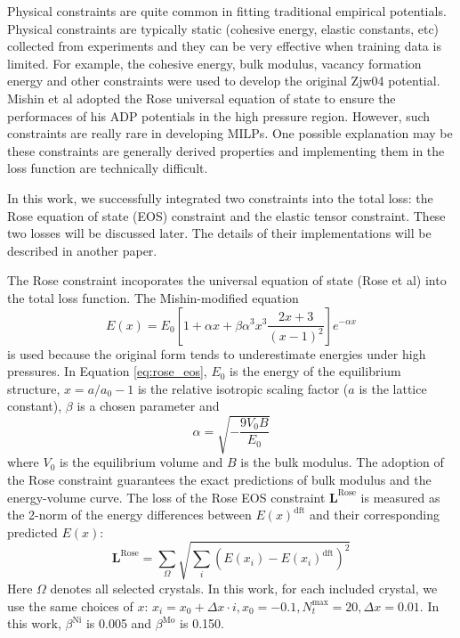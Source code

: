 \documentclass[prb,reprint]{revtex4-2}
\begin{document}
Physical constraints are quite common in fitting traditional empirical 
potentials. Physical constraints are typically static (cohesive energy, elastic 
constants, etc) collected from experiments and they can be very effective when 
training data is limited. For example, the cohesive energy, bulk modulus, 
vacancy formation energy and other constraints were used to develop the original 
Zjw04 potential. Mishin et al adopted the Rose universal equation of state to 
ensure the performaces of his ADP potentials in the high pressure region. 
However, such constraints are really rare in developing MILPs. One possible 
explanation may be these constraints are generally derived properties and 
implementing them in the loss function are technically difficult.

In this work, we successfully integrated two constraints into the total loss:
the Rose equation of state (EOS) constraint and the elastic tensor constraint. 
These two losses will be discussed later. The details of their implementations 
will be described in another paper.

The Rose constraint incoporates the universal equation of state (Rose et al) 
into the total loss function. The Mishin-modified equation 
\begin{equation}
\label{eq:rose_eos}
E(x) = E_{0}\left[
    1 + \alpha x + \beta \alpha^3 x^3 \frac{2x + 3}{(x - 1)^2} \right]
    e^{-\alpha x}
\end{equation}
is used because the original form tends to underestimate energies under high 
pressures. In Equation \ref{eq:rose_eos}, $E_{0}$ is the energy of the 
equilibrium structure, $x = a / a_{0} - 1$ is the relative isotropic scaling 
factor ($a$ is the lattice constant), $\beta$ is a chosen parameter and 
\begin{equation}
\label{eq:rose_alpha}
\alpha = \sqrt{-\frac{9 V_{0} B }{E_{0}}}
\end{equation}
where $V_0$ is the equilibrium volume and $B$ is the bulk modulus. The adoption
of the Rose constraint guarantees the exact predictions of bulk modulus and 
the energy-volume curve. The loss of the Rose EOS constraint 
$\mathbf{L}^{\mathrm{Rose}}$  is measured as the 2-norm of the energy 
differences between $E(x)^{\mathrm{dft}}$ and their corresponding predicted 
$E(x)$: 
\begin{equation}
\label{eq:rose_loss}
\mathbf{L}^{\mathrm{Rose}} = \sum_{\Omega}{
    \sqrt{\sum_{i}{\left(E(x_i) - E(x_i)^{\mathrm{dft}}\right)^2}}
}
\end{equation}
Here $\Omega$ denotes all selected crystals. In this work, for each included 
crystal, we use the same choices of $x$: 
$x_{i} = x_{0} + \Delta x \cdot i, x_{0} = -0.1, N_{t}^{\mathrm{max}} = 20, 
\Delta x=0.01$. In this work, $\beta^{\mathrm{Ni}}$ is 0.005 and 
$\beta^{\mathrm{Mo}}$ is 0.150.
 
\end{document}
